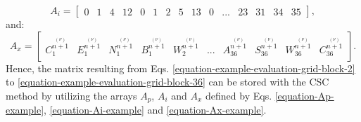 %
\begin{equation}
	\label{equation-Ai-example}
	A_i = 
	\begin{bmatrix}
		0	&1	&4	&12	&0	&1	&2	&5 &13 &0 &... &23 &31 &34 &35
	\end{bmatrix}
	,
\end{equation}
%
and:
%
\begin{equation}
	\label{equation-Ax-example}
	A_x = 
	\begin{bmatrix}
		C^{\stackrel{(\nu)}{n+1}}_{1} &E^{\stackrel{(\nu)}{n+1}}_{1} &N^{\stackrel{(\nu)}{n+1}}_{1} &B^{\stackrel{(\nu)}{n+1}}_{1} &W^{\stackrel{(\nu)}{n+1}}_{2} &... &A^{\stackrel{(\nu)}{n+1}}_{36} &S^{\stackrel{(\nu)}{n+1}}_{36} &W^{\stackrel{(\nu)}{n+1}}_{36} &C^{\stackrel{(\nu)}{n+1}}_{36}
	\end{bmatrix}
	.
\end{equation}
%
Hence, the matrix resulting from Eqs. \ref{equation-example-evaluation-grid-block-2} to \ref{equation-example-evaluation-grid-block-36} can be stored with the CSC method by utilizing the arrays $A_p$, $A_i$ and $A_x$ defined by Eqs. \ref{equation-Ap-example}, \ref{equation-Ai-example} and \ref{equation-Ax-example}.
%
